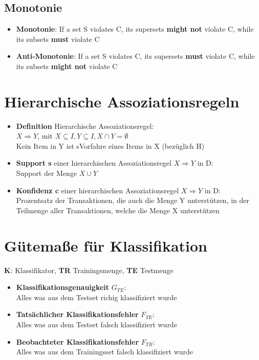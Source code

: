 \documentclass{article}
\begin{document}
\subsection{Monotonie}
\begin{itemize}
    \item \textbf{Monotonie}: If a set S violates C, its supersets
    \textbf{might not} violate C, while its subsets \textbf{must}
    violate C
    \item \textbf{Anti-Monotonie}: If a set S violates C, its supersets
    \textbf{must} violate C, while its subsets \textbf{might not}
    violate C
\end{itemize}
\section{Hierarchische Assoziationsregeln}
\begin{itemize}
    \item \textbf{Definition} Hierarchische Assoziationsregel: \\
    $X \Rightarrow Y$, mit $X \subseteq I, Y \subseteq I, X \cap Y = \emptyset$ \\
    Kein Item in Y ist sVorfahre eines Items in X (bezüglich H)
    \item \textbf{Support s} einer hierarchischen Assoziationsregel
    $X \Rightarrow Y$ in D: \\
    Support der Menge $X \cup Y$
    \item \textbf{Konfidenz c} einer hierarchischen Assoziationsregel
    $X \Rightarrow Y$ in D: \\
    Prozentsatz der Transaktionen, die auch die Menge Y unterstützen,
    in der Teilmenge aller Transaktionen, welche die Menge X unterstützen
\end{itemize}
\section{Gütemaße für Klassifikation}
\textbf{K}: Klassifikator, \textbf{TR} Trainingsmenge, \textbf{TE} 
Testmenge
\begin{itemize}
    \item \textbf{Klassifikationsgenauigkeit} $G_{TE}$: \\
    Alles was aus dem Testset richig klassifiziert wurde
    \item \textbf{Tatsächlicher Klassifikationsfehler} $F_{TE}$: \\
    Alles was aus dem Testset falsch klassifiziert wurde
    \item \textbf{Beobachteter Klassifikationsfehler} $F_{TR}$: \\
    Alles was aus dem Trainingsset falsch klassifiziert wurde
\end{itemize}
\end{document}
